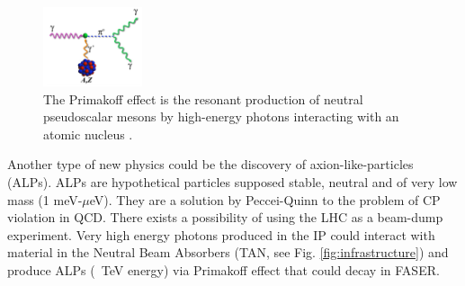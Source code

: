 \begin{figure}
  \centering
    \includegraphics[width=0.26\textwidth]{Primakoff.png}
    \caption[Primakoff Effect]{The Primakoff effect is the resonant production of neutral pseudoscalar mesons by high-energy photons interacting with an atomic nucleus \cite{kang_standard_1978}.}
    \label{fig:Primakoff}
\end{figure}

Another type of new physics could be the discovery of axion-like-particles (ALPs). ALPs are hypothetical particles supposed stable, neutral and of very low mass (1 meV-$\mu$eV). They are a solution by Peccei-Quinn to the problem of CP violation in QCD.
There exists a possibility of using the LHC as a beam-dump experiment. Very high energy photons produced in the IP could interact with material in the Neutral Beam Absorbers (TAN, see Fig. \ref{fig:infrastructure}) and produce ALPs (~TeV energy) via Primakoff effect that could decay in FASER.



